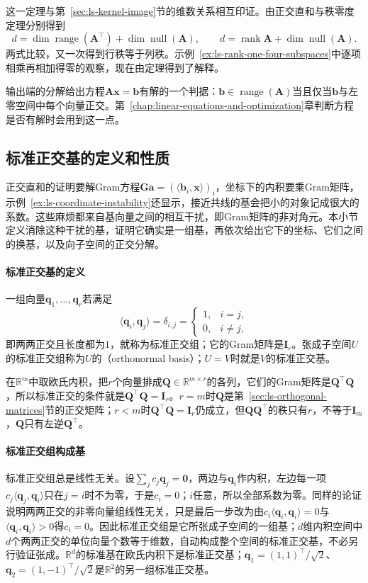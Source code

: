 这一定理与第~\ref{sec:ls-kernel-image}节的维数关系相互印证。由正交直和与秩零度定理分别得到
\[
 d=\dim\operatorname{range}(\bm A^\top)+\dim\operatorname{null}(\bm A),\qquad
 d=\operatorname{rank}\bm A+\dim\operatorname{null}(\bm A).
\]
两式比较，又一次得到行秩等于列秩。示例~\ref{ex:ls-rank-one-four-subspaces}中逐项相乘再相加得零的观察，现在由定理得到了解释。

输出端的分解给出方程$\bm A\bm x=\bm b$有解的一个判据：$\bm b\in\operatorname{range}(\bm A)$当且仅当$\bm b$与左零空间中每个向量正交。第~\ref{chap:linear-equations-and-optimization}章判断方程是否有解时会用到这一点。

\subsection{标准正交基的定义和性质}
\label{sec:ls-orthonormal-bases}

正交直和的证明要解Gram方程$\bm G\bm a=(\langle\bm b_i,\bm x\rangle)_i$，坐标下的内积要乘Gram矩阵，示例~\ref{ex:ls-coordinate-instability}还显示，接近共线的基会把小的对象记成很大的系数。这些麻烦都来自基向量之间的相互干扰，即Gram矩阵的非对角元。本小节定义消除这种干扰的基，证明它确实是一组基，再依次给出它下的坐标、它们之间的换基，以及向子空间的正交分解。

\paragraph{标准正交基的定义}
一组向量$\bm q_1,\ldots,\bm q_r$若满足
\[
 \langle\bm q_i,\bm q_j\rangle=\delta_{i,j}=\begin{cases}1,&i=j,\\0,&i\neq j,\end{cases}
\]
即两两正交且长度都为$1$，就称为标准正交组；它的Gram矩阵是$\bm I_r$。张成子空间$U$的标准正交组称为$U$的（orthonormal basis）；$U=V$时就是$V$的标准正交基。

在$\mathbb R^m$中取欧氏内积，把$r$个向量排成$\bm Q\in\mathbb R^{m\times r}$的各列，它们的Gram矩阵是$\bm Q^\top\bm Q$，所以标准正交的条件就是$\bm Q^\top\bm Q=\bm I_r$。$r=m$时$\bm Q$是第~\ref{sec:ls-orthogonal-matrices}节的正交矩阵；$r<m$时$\bm Q^\top\bm Q=\bm I_r$仍成立，但$\bm Q\bm Q^\top$的秩只有$r$，不等于$\bm I_m$，$\bm Q$只有左逆$\bm Q^\top$。

\paragraph{标准正交组构成基}
标准正交组总是线性无关。设$\sum_jc_j\bm q_j=\bm0$，两边与$\bm q_i$作内积，左边每一项$c_j\langle\bm q_j,\bm q_i\rangle$只在$j=i$时不为零，于是$c_i=0$；$i$任意，所以全部系数为零。同样的论证说明两两正交的非零向量组线性无关，只是最后一步改为由$c_i\langle\bm q_i,\bm q_i\rangle=0$与$\langle\bm q_i,\bm q_i\rangle>0$得$c_i=0$。因此标准正交组是它所张成子空间的一组基；$d$维内积空间中$d$个两两正交的单位向量个数等于维数，自动构成整个空间的标准正交基，不必另行验证张成。$\mathbb R^d$的标准基在欧氏内积下是标准正交基；$\bm q_1=(1,1)^\top/\sqrt2$、$\bm q_2=(1,-1)^\top/\sqrt2$是$\mathbb R^2$的另一组标准正交基。

